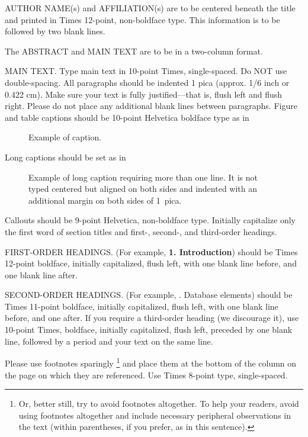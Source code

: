 \documentclass[times, 10pt,twocolumn]{article}
\begin{document}
AUTHOR NAME(s) and AFFILIATION(s) are to be centered beneath the title 
and printed in Times 12-point, non-boldface type. This information is to 
be followed by two blank lines.

The ABSTRACT and MAIN TEXT are to be in a two-column format. 

MAIN TEXT. Type main text in 10-point Times, single-spaced. Do NOT use 
double-spacing. All paragraphs should be indented 1 pica (approx. 1/6 
inch or 0.422 cm). Make sure your text is fully justified---that is, 
flush left and flush right. Please do not place any additional blank 
lines between paragraphs. Figure and table captions should be 10-point 
Helvetica boldface type as in
\begin{figure}[h]
   \caption{Example of caption.}
\end{figure}

\noindent Long captions should be set as in 
\begin{figure}[h] 
   \caption{Example of long caption requiring more than one line. It is 
     not typed centered but aligned on both sides and indented with an 
     additional margin on both sides of 1~pica.}
\end{figure}

\noindent Callouts should be 9-point Helvetica, non-boldface type. 
Initially capitalize only the first word of section titles and first-, 
second-, and third-order headings.

FIRST-ORDER HEADINGS. (For example, {\large \bf 1. Introduction}) 
should be Times 12-point boldface, initially capitalized, flush left, 
with one blank line before, and one blank line after.

SECOND-ORDER HEADINGS. (For example, {. Database elements}) 
should be Times 11-point boldface, initially capitalized, flush left, 
with one blank line before, and one after. If you require a third-order 
heading (we discourage it), use 10-point Times, boldface, initially 
capitalized, flush left, preceded by one blank line, followed by a period 
and your text on the same line.


Please use footnotes sparingly%
\footnote
   {%
     Or, better still, try to avoid footnotes altogether.  To help your 
     readers, avoid using footnotes altogether and include necessary 
     peripheral observations in the text (within parentheses, if you 
     prefer, as in this sentence).
   }
and place them at the bottom of the column on the page on which they are 
referenced. Use Times 8-point type, single-spaced.
\end{document}
